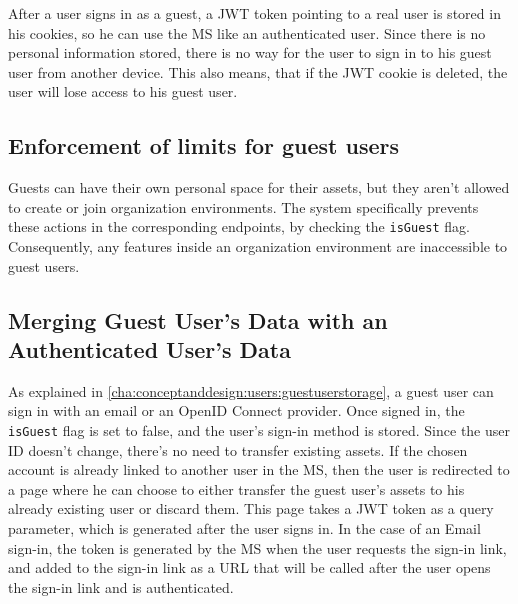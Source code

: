 %
%
%

After a user signs in as a guest, a JWT token pointing to a real user is stored in his
cookies, so he can use the MS like an authenticated user.
Since there is no personal information stored, there is no way for the user to sign in to
his guest user from another device.
This also means, that if the JWT cookie is deleted, the user will lose access to his guest
user.

\subsection{Enforcement of limits for guest users}

Guests can have their own personal space for their assets, but they aren't allowed to create or join organization environments.
The system specifically prevents these actions in the corresponding endpoints, by checking
the \lstinline{isGuest} flag.
Consequently, any features inside an organization environment are inaccessible to guest users.


\subsection{Merging Guest User's Data with an Authenticated User's Data}
\label{cha:ms-architecture:merge-guest-user-data}

As explained in \ref{cha:conceptanddesign:users:guestuserstorage}, a guest user can sign
in with an email or an OpenID Connect provider.
Once signed in, the \lstinline{isGuest} flag is set to false, and the user’s sign-in method is stored.
Since the user ID doesn't change, there’s no need to transfer existing assets.
If the chosen account is already linked to another user in the MS,
then the user is redirected to a page where he can choose to either transfer the guest user's assets to his 
already existing user or discard them.
This page takes a JWT token as a query parameter, which is generated after the user signs
in.
In the case of an Email sign-in, the token is generated by the MS when the user requests
the sign-in link, and added to the sign-in link as a URL that will be called after
the user opens the sign-in link and is authenticated.

